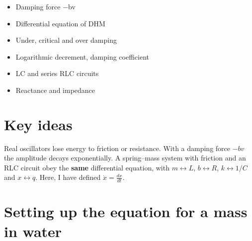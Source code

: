 \replacepage

\begin{itemize}
\item Damping force −bv
\item Differential equation of DHM
\item Under, critical and over damping
\item Logarithmic decrement, damping coefficient
\item LC and series RLC circuits
\item Reactance and impedance
\end{itemize}

 
\section{Key ideas}

 
\begin{keyidea}
Real oscillators lose energy to friction or resistance. With a damping force $-bv$ the amplitude decays exponentially. A spring–mass system with friction and an RLC circuit obey the \textbf{same} differential equation, with $m\leftrightarrow L$, $b\leftrightarrow R$, $k\leftrightarrow 1/C$ and $x\leftrightarrow q$. Here, I have defined $\dot x=\frac{dx}{dt}$.
\end{keyidea}

 
\begin{formulas}
\end{formulas}

 
\section{Setting up the equation for a mass in water}

